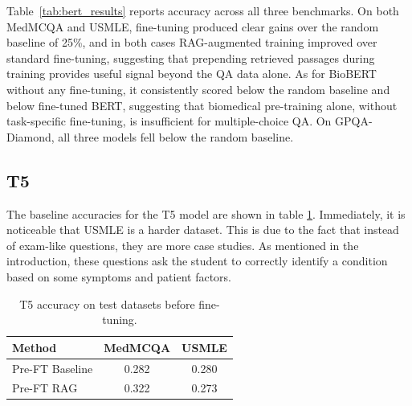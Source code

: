 \documentclass{article}
\begin{document}
Table~\ref{tab:bert_results} reports accuracy across all three benchmarks. On both MedMCQA and USMLE, fine-tuning produced clear gains over the random baseline of 25\%, and in both cases RAG-augmented training improved over standard fine-tuning, suggesting that prepending retrieved passages during training provides useful signal beyond the QA data alone. As for BioBERT without any fine-tuning, it consistently scored below the random baseline and below fine-tuned BERT, suggesting that biomedical pre-training alone, without task-specific fine-tuning, is insufficient for multiple-choice QA. On GPQA-Diamond, all three models fell below the random baseline.

\begin{table}[h]
    \centering
    \caption{Accuracy on MedMCQA, USMLE and GPQA
        Random chance is 25\% for all benchmarks.}
    \label{tab:bert_results}
\end{table}

\subsection{T5}

The baseline accuracies for the T5 model are shown in table \ref{tab:medmcqa_preft}. Immediately, it is noticeable that USMLE is a harder dataset. This is due to the fact that instead of exam-like questions, they are more case studies. As mentioned in the introduction, these questions ask the student to correctly identify a condition based on some symptoms and patient factors.

\begin{table}[h]
    \centering
    \begin{tabular}{lcc}
        \hline
        \textbf{Method} & \textbf{MedMCQA} & \textbf{USMLE} \\
        \hline
        Pre-FT Baseline & 0.282            & 0.280          \\
        Pre-FT RAG      & 0.322            & 0.273          \\
        \hline
    \end{tabular}
    \caption{T5 accuracy on test datasets before fine-tuning.}
    \label{tab:medmcqa_preft}
\end{table}
\end{document}
